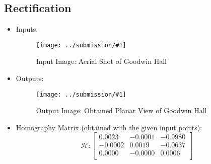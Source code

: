 \documentclass{article}
\newcommand{\listFigure}[3]{ \begin{figure}[H]
\texttt{[image: ../submission/\#1]}
		\caption{#2\label{fig:#3}}
	\end{figure}		
}
\begin{document}
\subsection{Rectification}
\begin{itemize}
\item Inputs:
	\listFigure{rectifyInput.png}{Input Image: Aerial Shot of Goodwin
	Hall}{rectifyInput}
	\item Outputs:
	\listFigure{rectifyOutput.png}{Output Image: Obtained Planar View of
	Goodwin Hall}{rectifyOutput}
	\item Homography Matrix (obtained with the given input points):
	$$ \mathcal{H}: \begin{bmatrix}
    0.0023 &  -0.0001 &  -0.9980 \\
   -0.0002 &   0.0019 &  -0.0637 \\
    0.0000 &  -0.0000 &   0.0006 \\
	\end{bmatrix}$$ 
\end{itemize}
\end{document}
